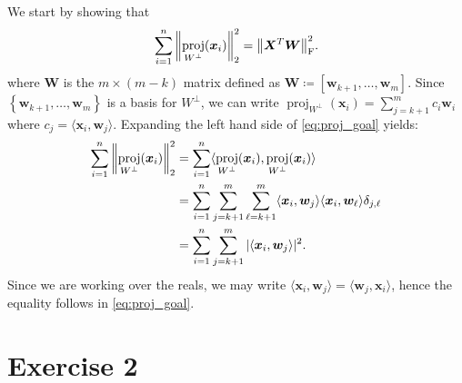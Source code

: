 \documentclass[article, a4paper, oneside, 12pt]{memoir}
\DeclareMathOperator{\proj}{proj}
\newcommand{\mat}[1]{\bm{#1}}
\newcommand{\frob}[1]{\norm{#1}_{\mathrm{F}}}
\begin{document}
We start by showing that 
\begin{equation}
    \label{eq:proj_goal}
    \sum_{i=1}^n \norm{\proj_{W^\perp} (\mat{x}_i)}^2_2 = \frob{\mat{X}^T\mat{W}}^2.
\end{equation}
where \( \mat{W} \) is the \( m \times (m - k) \) matrix defined as \( \mat{W}
\coloneqq [\mat{w}_{k+1}, \ldots, \mat{w}_{m}] \).
Since \( \left\{ \mat{w}_{k+1}, \ldots, \mat{w}_{m} \right\} \) is a basis for
\( W^\perp \), we can write \( \proj_{W^\perp} (\mat{x}_i) = \sum_{j = k + 1}^m
c_i \mat{w}_i \) where \( c_j = \langle \mat{x}_i, \mat{w}_j \rangle \).
Expanding the left hand side of \cref{eq:proj_goal} yields:
\begin{align}
    \begin{split}
        \sum_{i=1}^n \norm{\proj_{W^\perp} (\mat{x}_i)}^2_2 &= \sum_{i = 1}^n \langle
        \proj_{W^\perp}(\mat{x}_i), \proj_{W^\perp}(\mat{x}_i) \rangle \\ 
        &= \sum_{i = 1}^n \sum_{j = k+1}^m \sum_{\ell = k+1}^m \langle \mat{x}_i, \mat{w}_j \rangle \langle \mat{x}_i, \mat{w}_{\ell} \rangle \delta_{j, \ell} \\
        &= \sum_{i = 1}^n \sum_{j=k+1}^m |\langle \mat{x}_i, \mat{w}_j \rangle|^2.
    \end{split}
\end{align}
Since we are working over the reals, we may write \( \langle \mat{x}_i,
\mat{w}_j  \rangle = \langle \mat{w}_j, \mat{x}_i \rangle \), hence the
equality follows in \cref{eq:proj_goal}.

\chapter*{Exercise 2}
\end{document}

